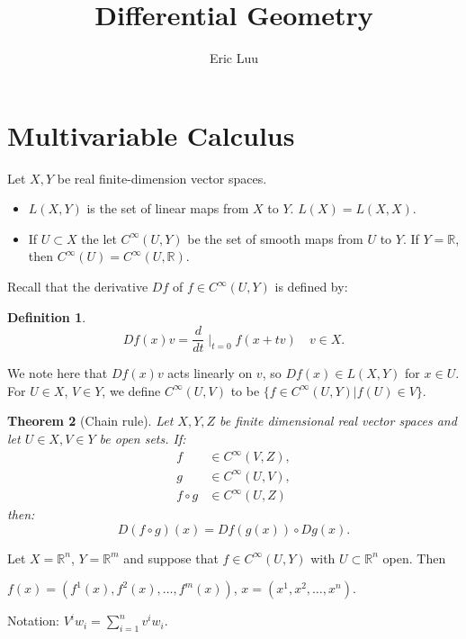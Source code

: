 \documentclass{article}
\title{Differential Geometry}
\author{Eric Luu}
\newtheorem{theorem}{Theorem}
\newtheorem{definition}[theorem]{Definition}
\theoremstyle{definition}
\numberwithin{theorem}{section}
\numberwithin{equation}{section}
\begin{document}
\maketitle

\section{Multivariable Calculus}

Let $X, Y$ be real finite-dimension vector spaces.

\begin{itemize}
	\item $L(X, Y)$ is the set of linear maps from $X$ to $Y$. $L(X) = L(X, X)$. 
	\item If $U \subset X$ the let $C^\infty(U, Y)$ be the set of smooth maps from $U$ to $Y$. If $Y = \mathbb{R}$, then $C^\infty(U) = C^\infty(U, \mathbb{R})$. 
\end{itemize}
Recall that the derivative $D f$ of $f \in C^\infty(U, Y)$ is defined by:
\begin{definition}
	\begin{equation}
		D f(x) v = \dfrac{d}{dt}\mid_{t = 0} f(x + tv) \quad v \in X.
	\end{equation}
\end{definition}
We note here that $D f(x) v$ acts linearly on $v$, so $D f(x) \in L(X, Y)$ for $x \in U$. 
For $U \in X$, $V \in Y$, we define $C^\infty(U, V)$ to be $\{ f \in C^\infty(U, Y) | f(U) \in V\}$.

\begin{theorem}[Chain rule]
	Let $X, Y, Z$ be finite dimensional real vector spaces and let $U \in X, V \in Y$ be open sets. If: 
	\begin{align*}
		f &\in C^\infty(V, Z),\\
		g &\in C^\infty(U, V),\\
		f \circ g &\in C^\infty(U, Z)
	\end{align*}
	then:
	\begin{equation}
		D(f \circ g) (x) = D f(g(x)) \circ D g(x).
	\end{equation}
\end{theorem}

Let $X = \mathbb{R}^n$, $Y = \mathbb{R}^m$ and suppose that $f \in C^\infty (U, Y)$ with $U \subset \mathbb{R}^n$ open. Then 

$f(x) = (f^1(x), f^2(x), \ldots, f^m(x))$, $x = (x^1, x^2, \ldots, x^n)$. 

Notation: $V^i w_i = \sum_{i = 1}^n v^i w_i$. 
\end{document}
